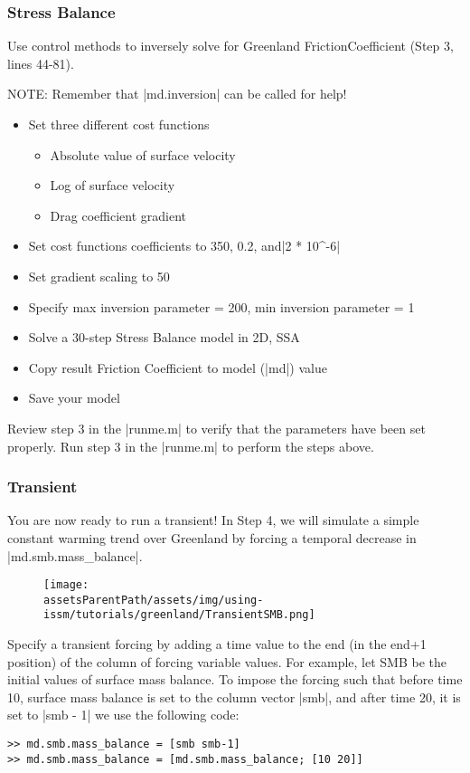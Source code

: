 \subsubsection{Stress Balance} %
Use control methods to inversely solve for Greenland FrictionCoefficient (Step 3, lines 44-81).

NOTE: Remember that \lstinlinebg|md.inversion| can be called for help!
\begin{itemize}
	\item Set three different cost functions
		\begin{itemize}
			\item Absolute value of surface velocity
			\item Log of surface velocity
			\item Drag coefficient gradient
		\end{itemize}
	\item Set cost functions coefficients to 350, 0.2, and\lstinlinebg|2 * 10^-6|
	\item Set gradient scaling to 50
	\item Specify max inversion parameter = 200, min inversion parameter = 1
	\item Solve a 30-step Stress Balance model in 2D, SSA
	\item Copy result Friction Coefficient to model (\lstinlinebg|md|) value
	\item Save your model
\end{itemize}

Review step 3 in the \lstinlinebg|runme.m| to verify that the parameters have been set properly. Run step 3 in the \lstinlinebg|runme.m| to perform the steps above.

\subsubsection{Transient} %
You are now ready to run a transient! In Step 4, we will simulate a simple constant warming trend over Greenland by forcing a temporal decrease in \lstinlinebg|md.smb.mass_balance|.

\begin{figure}[H]
	\begin{center}
		\texttt{[image: \\assetsParentPath/assets/img/using-issm/tutorials/greenland/TransientSMB.png]}
	\end{center}
\end{figure}

Specify a transient forcing by adding a time value to the end (in the end+1 position) of the column of forcing variable values. For example, let SMB be the initial values of surface mass balance. To impose the forcing such that before time 10, surface mass balance is set to the column vector \lstinlinebg|smb|, and after time 20, it is set to \lstinlinebg|smb - 1| we use the following code:
\begin{lstlisting}
>> md.smb.mass_balance = [smb smb-1]
>> md.smb.mass_balance = [md.smb.mass_balance; [10 20]]
\end{lstlisting}

